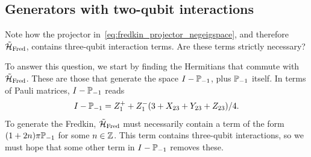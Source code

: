 \subsection{Generators with two-qubit interactions}
Note how the projector in~\cref{eq:fredkin_projector_negeigspace}, and therefore $\tilde{\mathcal{H}}_{\operatorname{Fred}}$, contains three-qubit interaction terms.
Are these terms strictly necessary?

To answer this question, we start by finding the Hermitians that commute with $\tilde{\mathcal{H}}_{\operatorname{Fred}}$.
These are those that generate the space $I-\mathbb{P}_{-1}$, plus $\mathbb{P}_{-1}$ itself.
In terms of Pauli matrices, $I-\mathbb{P}_{-1}$ reads
\begin{equation}
    I - \mathbb{P}_{-1} = Z_1^+ + Z_1^- (3 + X_{23} + Y_{23} + Z_{23})/4.
\end{equation}
To generate the Fredkin, $\tilde{\mathcal{H}}_{\operatorname{Fred}}$ must necessarily contain a term of the form
$(1 + 2n)\pi \mathbb{P}_{-1}$ for some $n\in\mathbb{Z}$.
This term contains three-qubit interactions, so we must hope that some other term in $I-\mathbb{P}_{-1}$ removes these.



